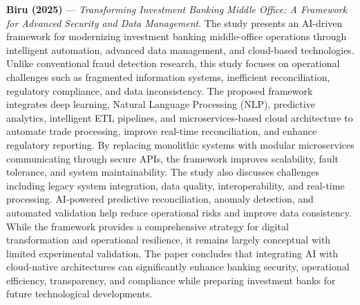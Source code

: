 \documentclass[conference]{IEEEtran}
\begin{document}
\par\medskip

\noindent\textbf{Biru (2025)}\nocite{Biru2025MiddleOffice} --- \emph{Transforming Investment Banking Middle Office: A Framework for Advanced Security and Data Management}. The study presents an AI-driven framework for modernizing investment banking middle-office operations through intelligent automation, advanced data management, and cloud-based technologies. Unlike conventional fraud detection research, this study focuses on operational challenges such as fragmented information systems, inefficient reconciliation, regulatory compliance, and data inconsistency. The proposed framework integrates deep learning, Natural Language Processing (NLP), predictive analytics, intelligent ETL pipelines, and microservices-based cloud architecture to automate trade processing, improve real-time reconciliation, and enhance regulatory reporting. By replacing monolithic systems with modular microservices communicating through secure APIs, the framework improves scalability, fault tolerance, and system maintainability. The study also discusses challenges including legacy system integration, data quality, interoperability, and real-time processing. AI-powered predictive reconciliation, anomaly detection, and automated validation help reduce operational risks and improve data consistency. While the framework provides a comprehensive strategy for digital transformation and operational resilience, it remains largely conceptual with limited experimental validation. The paper concludes that integrating AI with cloud-native architectures can significantly enhance banking security, operational efficiency, transparency, and compliance while preparing investment banks for future technological developments.

\par\medskip
\end{document}
